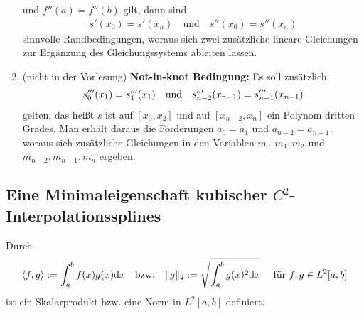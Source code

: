 \begin{enumerate}[label=(\alph*)]
	und $f''(a)=f''(b)$ gilt, dann sind 
	\begin{align}
	\label{1.15}
		s'(x_0)=s'(x_n)\quad\text{und}\quad s''(x_0)=s''(x_n)
	\end{align}
	sinnvolle Randbedingungen, woraus sich zwei zusätzliche lineare Gleichungen zur Ergänzung des Gleichungssystems ableiten lassen.
	\item (nicht in der Vorlesung) \textbf{Not-in-knot Bedingung:} Es soll zusätzlich
	\begin{align}
		s'''_0(x_1)=s'''_1(x_1) \quad\text{und}\quad s'''_{n-2}(x_{n-1})=s'''_{n-1}(x_{n-1})\notag
	\end{align}
	gelten, das heißt $s$ ist auf $[x_0,x_2]$ und auf $[x_{n-2},x_n]$ ein Polynom dritten Grades. Man erhält daraus die Forderungen $a_0=a_1$ und $a_{n-2}=a_{n-1}$, woraus sich zusätzliche Gleichungen in den Variablen $m_0,m_1,m_2$ und $m_{n-2},m_{n-1},m_n$ ergeben.
\end{enumerate}

\subsection{Eine Minimaleigenschaft kubischer $C^2$-Interpolationssplines}

Durch
\begin{align}
	\left\langle f,g\right\rangle:= \int_a^b f(x)g(x)\mathrm{d} x\quad\text{bzw.}\quad\Vert g\Vert_2:=\sqrt{\int_a^b g(x)^2\mathrm{d} x} \quad\text{ für } f,g\in L^2[a,b]\notag
\end{align}
ist ein Skalarprodukt bzw. eine Norm in $L^2[a,b]$ definiert.

